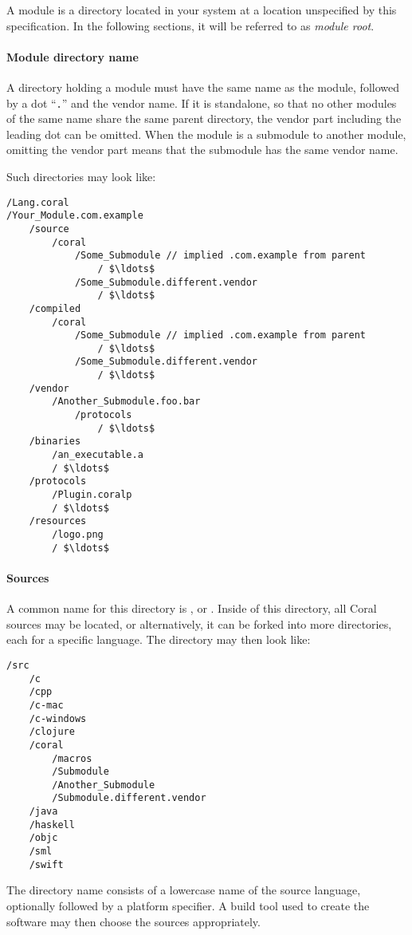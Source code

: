 A module is a directory located in your system at a location unspecified by this specification. In the following sections, it will be referred to as {\em module root}. 

\paragraph{Module directory name}
A directory holding a module must have the same name as the module, followed by a dot ``\lstinline!.!'' and the vendor name. If it is standalone, so that no other modules of the same name share the same parent directory, the vendor part including the leading dot can be omitted. When the module is a submodule to another module, omitting the vendor part means that the submodule has the same vendor name. 

\example Such directories may look like:
\begin{lstlisting}
/Lang.coral
/Your_Module.com.example
    /source
        /coral
            /Some_Submodule // implied .com.example from parent
                / $\ldots$
            /Some_Submodule.different.vendor
                / $\ldots$
    /compiled
        /coral
            /Some_Submodule // implied .com.example from parent
                / $\ldots$
            /Some_Submodule.different.vendor
                / $\ldots$
    /vendor
        /Another_Submodule.foo.bar
            /protocols
                / $\ldots$
    /binaries
        /an_executable.a
        / $\ldots$
    /protocols
        /Plugin.coralp
        / $\ldots$
    /resources
        /logo.png
        / $\ldots$
\end{lstlisting} 

\paragraph{Sources}
A common name for this directory is , or . Inside of this directory, all Coral sources may be located, or alternatively, it can be forked into more directories, each for a specific language. The directory may then look like:
\begin{lstlisting}
/src
    /c
    /cpp
    /c-mac
    /c-windows
    /clojure
    /coral
        /macros
        /Submodule
        /Another_Submodule
        /Submodule.different.vendor
    /java
    /haskell
    /objc
    /sml
    /swift
\end{lstlisting}

The directory name consists of a lowercase name of the source language, optionally followed by a platform specifier. A build tool used to create the software may then choose the sources appropriately. 

